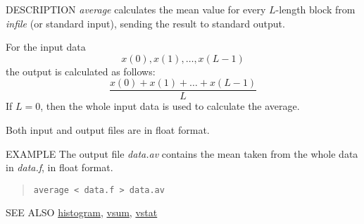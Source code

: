 \begin{synopsis}
\item [average] [ --l $L$ ] [ --n $N$ ] [ {\em infile} ] 
\end{synopsis}

\begin{qsection}{DESCRIPTION}
{\em average} calculates the mean value for every $L$-length block 
from {\em infile} (or standard input),
sending the result to standard output.

For the input data
\begin{displaymath}
  x(0),x(1),\ldots,x(L-1)
\end{displaymath}
the output is calculated as follows:
\begin{displaymath}
\frac{x(0)+x(1)+\ldots+x(L-1)}{L}
\end{displaymath}
If $L=0$, then the whole input data is used to calculate the average.
\par
Both input and output files are in float format.
\end{qsection}

\begin{options}
\end{options}

\begin{qsection}{EXAMPLE}
The output file {\em data.av} contains the mean taken from the whole data in
{\em data.f}, in float format.
\begin{quote}
 \verb!average < data.f > data.av!
\end{quote} 
\end{qsection}

\begin{qsection}{SEE ALSO}
\hyperlink{histogram}{histogram},
\hyperlink{vsum}{vsum},
\hyperlink{vstat}{vstat}
\end{qsection}

